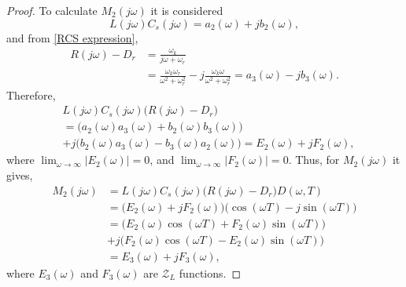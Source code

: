 \begin{proof}
To calculate $M_2(j\omega)$ it is considered
\begin{equation}
    \label{eq: M2}
     L(j\omega)C_s(j\omega)=a_2(\omega)+jb_2(\omega),
\end{equation}
and from \eqref{RCS expression},
\begin{equation}
    \label{eq: M2'}
    \begin{split}
     R(j\omega)-D_r&=\frac{\omega_k}{j\omega+\omega_r} \\
     &=\frac{\omega_k \omega_r}{\omega^2+\omega_r ^{2}}-j\frac{\omega_k\omega}{\omega^2+\omega_r ^{2}}=a_3(\omega)-jb_3(\omega).
     \end{split}
\end{equation}
Therefore,
 \begin{equation}
    \label{eq: M2''}
    \begin{split}
    &L(j\omega)C_s(j\omega)\Big(R(j\omega)-D_r\Big)\\
     &=\Big(a_2(\omega)a_3(\omega)+b_2(\omega)b_3(\omega)\Big) \\
     &+j\Big(b_2(\omega)a_3(\omega)-b_3(\omega)a_2(\omega)\Big)=E_2(\omega)+jF_2(\omega),
     \end{split}
\end{equation}
where $\lim_{\omega\to\infty} |E_2(\omega)|=0$, and $\lim_{\omega\to\infty} |F_2(\omega)|=0$. Thus, for $M_2(j\omega)$ it gives,
\begin{equation}
    \label{eq: M2'''}
    \begin{split}
      M_2(j\omega)&=L(j\omega)C_s(j\omega)\Big(R(j\omega)-D_r\Big)D(\omega,T)\\
     &=\Big(E_2(\omega)+jF_2(\omega)\Big)\Big(\cos{(\omega T)}-j\sin{(\omega T)}\Big)\\
     &=\Big(E_2(\omega)\cos{(\omega T)}+F_2(\omega)\sin{(\omega T)}\Big)\\
    &+j\Big(F_2(\omega)\cos{(\omega T)}-E_2(\omega)\sin{(\omega T)}\Big)\\
    &=E_3(\omega)+jF_3(\omega),
     \end{split}
\end{equation}
where $E_3(\omega)$ and $F_3(\omega)$ are $\mathcal{Z}_L$ functions.


\end{proof}
